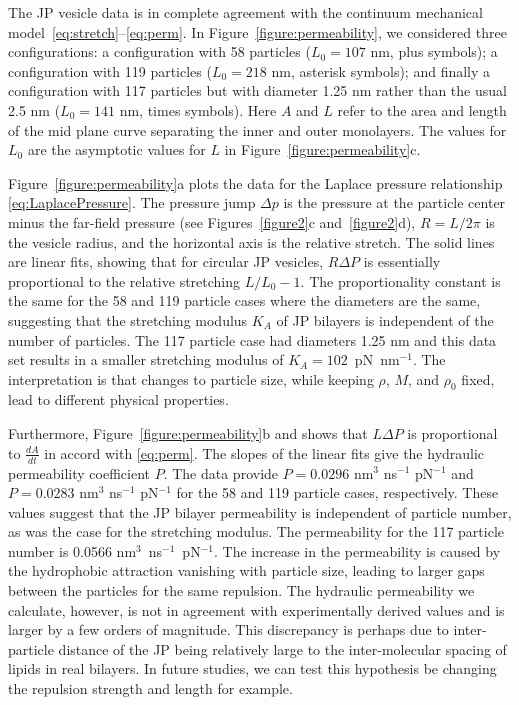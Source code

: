 \documentclass[lineno]{jfm}
\begin{document}
The JP vesicle data is in complete agreement with the continuum
mechanical model~\eqref{eq:stretch}--\eqref{eq:perm}. In
Figure~\ref{figure:permeability}, we considered three configurations: a
configuration with 58 particles ($L_0 = 107$ nm, plus symbols); a
configuration with 119 particles ($L_0 = 218$ nm, asterisk symbols); and
finally a configuration with 117 particles but with diameter 1.25 nm
rather than the usual 2.5 nm ($L_0 = 141$ nm, times symbols). Here $A$
and $L$ refer to the area and length of the mid plane curve separating
the inner and outer monolayers. The values for $L_0$ are the asymptotic
values for $L$ in Figure~\ref{figure:permeability}c.

Figure~\ref{figure:permeability}a plots the data for the Laplace
pressure relationship \eqref{eq:LaplacePressure}. The pressure jump
$\Delta p$ is the pressure at the particle center minus the far-field
pressure (see Figures~\ref{figure2}c and~\ref{figure2}d), $R = L/2\pi$
is the vesicle radius, and the horizontal axis is the relative stretch.
The solid lines are linear fits, showing that for circular JP vesicles,
$R\Delta P$ is essentially proportional to the relative stretching
$L/L_0 - 1$. The proportionality constant is the same for the 58 and 119
particle cases where the diameters are the same, suggesting that the
stretching modulus $K_A$ of JP bilayers is independent of the number of
particles. The 117 particle case had diameters 1.25 nm and this data set
results in a smaller stretching modulus of $K_A = 102$~pN~nm$^{-1}$. The
interpretation is that changes to particle size, while keeping $\rho$,
$M$, and $\rho_0$ fixed, lead to different physical properties.

Furthermore, Figure~\ref{figure:permeability}b and shows that $L\Delta
P$ is proportional to $\frac{dA}{dt}$ in accord with \eqref{eq:perm}.
The slopes of the linear fits give the hydraulic permeability
coefficient $P$. The data provide $P = 0.0296$ nm$^3$ ns$^{-1}$
pN$^{-1}$ and $P = 0.0283$ nm$^3$ ns$^{-1}$ pN$^{-1}$ for the 58 and 119
particle cases, respectively. These values suggest that the JP bilayer
permeability is independent of particle number, as was the case for the
stretching modulus. The permeability for the 117 particle number is
0.0566 nm$^3$~ns$^{-1}$~pN$^{-1}$. The increase in the permeability is
caused by the hydrophobic attraction vanishing with particle size,
leading to larger gaps between the particles for the same repulsion. The
hydraulic permeability we calculate, however, is not in agreement with
experimentally derived values and is larger by a few orders of
magnitude. This discrepancy is perhaps due to inter-particle distance of
the JP being relatively large to the inter-molecular spacing of lipids
in real bilayers. In future studies, we can test this hypothesis be
changing the repulsion strength and length for example. 
\end{document}
